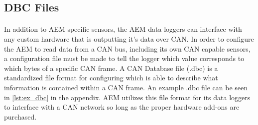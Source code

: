 \subsection{DBC Files}

\paragraph{}
In addition to AEM specific sensors, the AEM data loggers can interface with any custom hardware that is outputting it's data over CAN.
In order to configure the AEM to read data from a CAN bus, including its own CAN capable sensors, a configuration file must be made to tell the logger which value corresponds to which bytes of a specific CAN frame.
A CAN Database file (.dbc) is a standardized file format for configuring which is able to describe what information is contained within a CAN frame.
An example .dbc file can be seen in \cref{lst:ex_dbc} in the appendix.
AEM utilizes this file format for its data loggers to interface with a CAN network so long as the proper hardware add-ons are purchased.